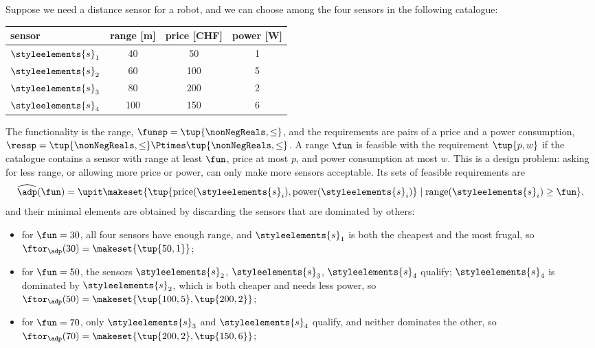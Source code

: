 \begin{example}
    \label{exa:sensor-catalogue}
    Suppose we need a distance sensor for a robot, and we can choose among the four sensors in the following catalogue:
    \begin{center}
        \begin{tabular}{lccc}
            sensor & range [m] & price [CHF] & power [W] \\ \hline
            $\styleelements{s}_1$ & 40 & 50 & 1 \\
            $\styleelements{s}_2$ & 60 & 100 & 5 \\
            $\styleelements{s}_3$ & 80 & 200 & 2 \\
            $\styleelements{s}_4$ & 100 & 150 & 6
        \end{tabular}
    \end{center}
    The functionality is the range, $\funsp = \tup{\nonNegReals, \leq}$, and the requirements are pairs of a price and a power consumption, $\ressp = \tup{\nonNegReals, \leq} \Ptimes \tup{\nonNegReals, \leq}$.
    A range $\fun$ is feasible with the requirement $\tup{p, w}$ if the catalogue contains a sensor with range at least $\fun$, price at most $p$, and power consumption at most $w$.
    This is a design problem: asking for less range, or allowing more price or power, can only make more sensors acceptable.
    Its sets of feasible requirements are
    \begin{equation}
        \widehat{\adp}(\fun) = \upit \makeset{\tup{\text{price}(\styleelements{s}_i), \text{power}(\styleelements{s}_i)} \mid \text{range}(\styleelements{s}_i) \geq \fun},
    \end{equation}
    and their minimal elements are obtained by discarding the sensors that are dominated by others:
    \begin{itemize}
        \item for $\fun = 30$, all four sensors have enough range, and $\styleelements{s}_1$ is both the cheapest and the most frugal, so $\ftor_{\adp}(30) = \makeset{\tup{50, 1}}$;
        \item for $\fun = 50$, the sensors $\styleelements{s}_2$, $\styleelements{s}_3$, $\styleelements{s}_4$ qualify; $\styleelements{s}_4$ is dominated by $\styleelements{s}_2$, which is both cheaper and needs less power, so $\ftor_{\adp}(50) = \makeset{\tup{100, 5}, \tup{200, 2}}$;
        \item for $\fun = 70$, only $\styleelements{s}_3$ and $\styleelements{s}_4$ qualify, and neither dominates the other, so $\ftor_{\adp}(70) = \makeset{\tup{200, 2}, \tup{150, 6}}$;

\end{itemize}
\end{example}
